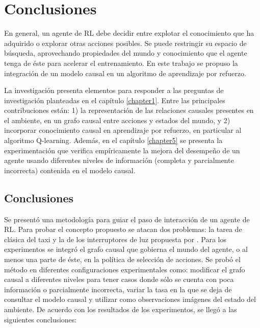 \chapter{Conclusiones}\label{chapter6}

\graphicspath{{Chapter5/Figs/}}


En general, un agente de RL debe decidir entre explotar el conocimiento que ha adquirido o explorar otras acciones posibles. Se puede restringir su espacio de búsqueda, aprovechando 
propiedades del mundo y conocimiento que el agente tenga
de éste para acelerar el entrenamiento.
En este trabajo se propuso la integración de un modelo causal en un
algoritmo de aprendizaje por refuerzo.

La investigación presenta
elementos para responder a las preguntas de investigación planteadas en el capítulo \ref{chapter1}. Entre las principales contribuciones están: 1) la representación de las relaciones causales presentes en el ambiente, en un grafo causal entre acciones y estados del mundo, y 2) incorporar conocimiento causal en aprendizaje por refuerzo, en particular al
algoritmo Q-learning.
Además, en el capítulo \ref{chapter5} se presenta la experimentación que verifica empíricamente
    la mejora del desempeño de un agente usando diferentes niveles de información (completa y parcialmente incorrecta) contenida en el modelo causal. 

\section{Conclusiones}

Se presentó una metodología para guiar el paso de interacción de un agente de RL.
Para probar el concepto propuesto se atacan dos problemas: la tarea de clásica del taxi \cite{Dietterich:2000:HRL:1622262.1622268} y la de los
interruptores de luz propuesta por \cite{nair2019causal}.
Para los experimentos se integró el grafo causal que gobierna el mundo del agente, o al menos una parte de éste, en la política de selección de acciones. Se probó el método en diferentes configuraciones experimentales como: modificar el grafo causal a diferentes niveles para tener casos donde sólo se cuenta con poca información o parcialmente incorrecta, variar la tasa en la que se deja de consultar el modelo causal y utilizar como observaciones imágenes del estado del ambiente. De acuerdo con los resultados de los experimentos, se llegó a las siguientes conclusiones:

